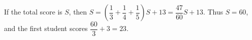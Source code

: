 If the total score is $S$, then $S=\left(\dfrac{1}{3}+\dfrac{1}{4}+\dfrac{1}{5}\right)S+13=\dfrac{47}{60}S+13$. Thus $S=60$, and the first student scores $\dfrac{60}{3}+3=\boxed{23}$.
